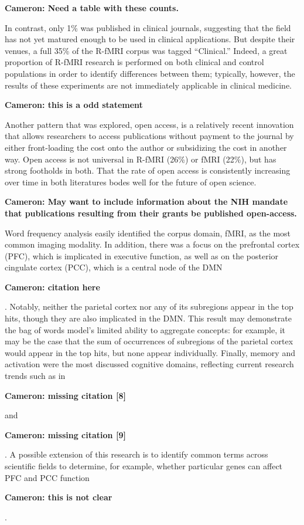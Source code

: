 \documentclass[5p]{elsarticle}
\newcommand\MyCBox[1]{%
  \colorbox{yellow!60}{\begin{varwidth}{\dimexpr\linewidth-2\fboxsep}#1\end{varwidth}}}
\newcommand{\COMMENTCC}[1]{\MyCBox{\textcolor{cc_commentcolor}{\textbf{Cameron:
#1}}}}
\begin{document}
\COMMENTCC{Need a table with these counts.}

In contrast, only 1\% was published in clinical journals, suggesting that the
field has not yet matured enough to be used in clinical applications. But
despite their venues, a full 35\% of the R-fMRI corpus was tagged “Clinical.”
Indeed, a great proportion of R-fMRI research is performed on both clinical and
control populations in order to identify differences between them; typically,
however, the results of these experiments are not immediately applicable in
clinical medicine. \COMMENTCC{this is a odd statement}

Another pattern that was explored, open access, is a relatively recent
innovation that allows researchers to access publications without payment to the
journal by either front-loading the cost onto the author or subsidizing the cost
in another way. Open access is not universal in R-fMRI (26\%) or fMRI (22\%), but
has strong footholds in both. That the rate of open access is consistently
increasing over time in both literatures bodes well for the future of open
science. \COMMENTCC{May want to include information about the NIH mandate
that publications resulting from their grants be published open-access.}

Word frequency analysis easily identified the corpus domain, fMRI, as the most
common imaging modality. In addition, there was a focus on the prefrontal cortex
(PFC), which is implicated in executive function, as well as on the posterior
cingulate cortex (PCC), which is a central node of the DMN
\COMMENTCC{citation here}.
Notably, neither the parietal cortex nor any of its subregions appear in the top
hits, though they are also implicated in the DMN. This result may demonstrate the bag
of words model’s limited ability to aggregate concepts: for example, it may be
the case that the sum of occurrences of subregions of the parietal cortex would
appear in the top hits, but none appear individually. Finally, memory and
activation were the most discussed cognitive domains, reflecting current
research trends such as in \COMMENTCC{missing citation [8]} and
\COMMENTCC{missing citation [9]}. A possible extension of this research is
to identify common terms across scientific fields to determine, for example,
whether particular genes can affect PFC and PCC function \COMMENTCC{this is
not clear}.
\end{document}
